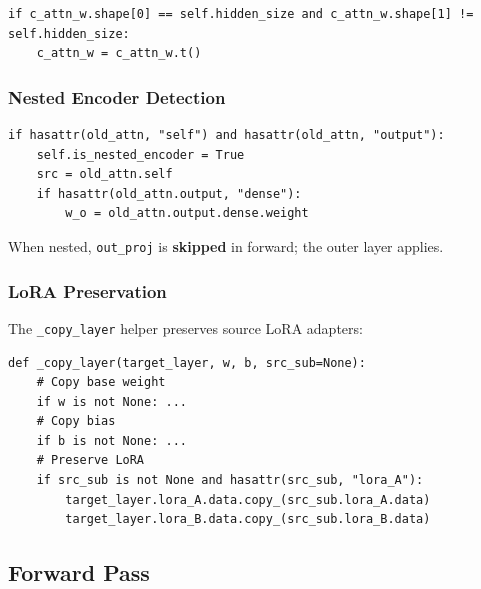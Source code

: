 \begin{lstlisting}
if c_attn_w.shape[0] == self.hidden_size and c_attn_w.shape[1] != self.hidden_size:
    c_attn_w = c_attn_w.t()
\end{lstlisting}

\subsubsection{Nested Encoder Detection}

\begin{lstlisting}
if hasattr(old_attn, "self") and hasattr(old_attn, "output"):
    self.is_nested_encoder = True
    src = old_attn.self
    if hasattr(old_attn.output, "dense"):
        w_o = old_attn.output.dense.weight
\end{lstlisting}

When nested, \texttt{out\_proj} is \textbf{skipped} in forward; the outer layer applies.

\subsubsection{LoRA Preservation}

The \texttt{\_copy\_layer} helper preserves source LoRA adapters:

\begin{lstlisting}
def _copy_layer(target_layer, w, b, src_sub=None):
    # Copy base weight
    if w is not None: ...
    # Copy bias
    if b is not None: ...
    # Preserve LoRA
    if src_sub is not None and hasattr(src_sub, "lora_A"):
        target_layer.lora_A.data.copy_(src_sub.lora_A.data)
        target_layer.lora_B.data.copy_(src_sub.lora_B.data)
\end{lstlisting}

\subsection{Forward Pass}

